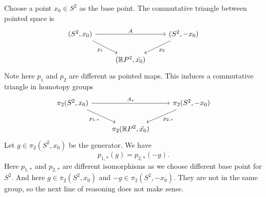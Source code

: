 \documentclass[letterpaper, 12pt]{article}
\begin{document}
\begin{solution}
Choose a point \(x_0\in S^2\) as the base point. The commutative triangle between pointed space is 
\[\begin{tikzcd}
	{(S^2,x_0)} && {(S^2,-x_0)} \\
	& {(\mathbb{R}P^2,\tilde{x_0})}
	\arrow["A", from=1-1, to=1-3]
	\arrow["{p_1}"', from=1-1, to=2-2]
	\arrow["{p_2}", from=1-3, to=2-2]
\end{tikzcd}\]
Note here \(p_1\) and \(p_2\) are different as pointed maps. This induces a commutative triangle in homotopy groups 
\[\begin{tikzcd}
	{\pi_2(S^2,x_0)} && {\pi_2(S^2,-x_0)} \\
	& {\pi_2(\mathbb{R}P^2,\tilde{x_0})}
	\arrow["{A_*}", from=1-1, to=1-3]
	\arrow["{p_{1,*}}"', from=1-1, to=2-2]
	\arrow["{p_{2,*}}", from=1-3, to=2-2]
\end{tikzcd}\]
Let \(g\in \pi_2(S^2,x_0)\) be the generator. We have 
\[p_{1,*}(g)=p_{2,*}(-g).\]
Here \(p_{1,*}\) and \(p_{2,*}\) are different isomorphisms as we choose different base point for \(S^2\). And here \(g\in \pi_2(S^2,x_0)\) and \(-g\in \pi_2(S^2,-x_0)\). They are not in the same group, so the next line of reasoning does not make sense. 
\end{solution}
\end{document}
